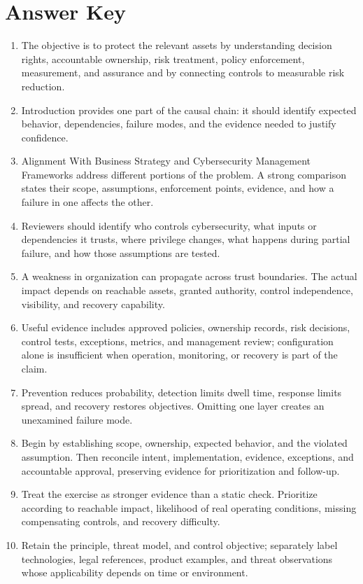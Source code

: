 \documentclass[11pt]{article}
\begin{document}
\section*{Answer Key}
\begin{enumerate}
\item The objective is to protect the relevant assets by understanding decision rights, accountable ownership, risk treatment, policy enforcement, measurement, and assurance and by connecting controls to measurable risk reduction.
\item Introduction provides one part of the causal chain: it should identify expected behavior, dependencies, failure modes, and the evidence needed to justify confidence.
\item Alignment With Business Strategy and Cybersecurity Management Frameworks address different portions of the problem. A strong comparison states their scope, assumptions, enforcement points, evidence, and how a failure in one affects the other.
\item Reviewers should identify who controls cybersecurity, what inputs or dependencies it trusts, where privilege changes, what happens during partial failure, and how those assumptions are tested.
\item A weakness in organization can propagate across trust boundaries. The actual impact depends on reachable assets, granted authority, control independence, visibility, and recovery capability.
\item Useful evidence includes approved policies, ownership records, risk decisions, control tests, exceptions, metrics, and management review; configuration alone is insufficient when operation, monitoring, or recovery is part of the claim.
\item Prevention reduces probability, detection limits dwell time, response limits spread, and recovery restores objectives. Omitting one layer creates an unexamined failure mode.
\item Begin by establishing scope, ownership, expected behavior, and the violated assumption. Then reconcile intent, implementation, evidence, exceptions, and accountable approval, preserving evidence for prioritization and follow-up.
\item Treat the exercise as stronger evidence than a static check. Prioritize according to reachable impact, likelihood of real operating conditions, missing compensating controls, and recovery difficulty.
\item Retain the principle, threat model, and control objective; separately label technologies, legal references, product examples, and threat observations whose applicability depends on time or environment.
\end{enumerate}
\end{document}
